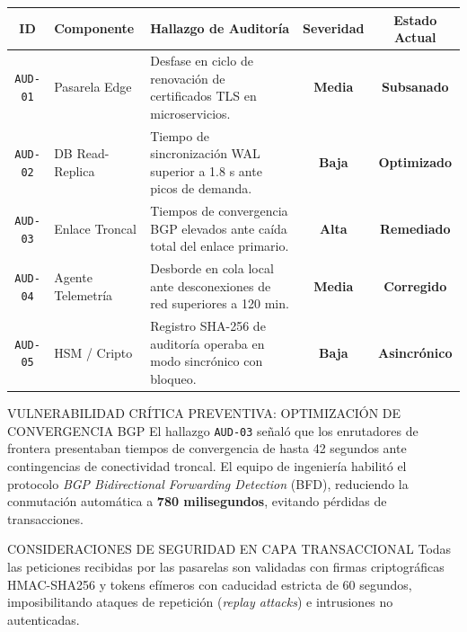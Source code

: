 \documentclass[11pt,letterpaper]{article}
\begin{document}
\noindent
\begin{tabularx}{\linewidth}{@{}c p{2.8cm} X c c@{}}
  \toprule
  \textbf{\color{corpPrimary}ID} & \textbf{\color{corpPrimary}Componente} & \textbf{\color{corpPrimary}Hallazgo de Auditor\'ia} & \textbf{\color{corpPrimary}Severidad} & \textbf{\color{corpPrimary}Estado Actual} \\
  \midrule
  \texttt{AUD-01} & Pasarela Edge & Desfase en ciclo de renovaci\'on de certificados TLS en microservicios. & \textbf{\color{corpWarning}Media} & \textbf{\color{corpSuccess}Subsanado} \\
  \addlinespace[3pt]
  \texttt{AUD-02} & DB Read-Replica & Tiempo de sincronizaci\'on WAL superior a 1.8 s ante picos de demanda. & \textbf{\color{corpWarning}Baja} & \textbf{\color{corpSuccess}Optimizado} \\
  \addlinespace[3pt]
  \texttt{AUD-03} & Enlace Troncal & Tiempos de convergencia BGP elevados ante ca\'ida total del enlace primario. & \textbf{\color{corpDanger}Alta} & \textbf{\color{corpSuccess}Remediado} \\
  \addlinespace[3pt]
  \texttt{AUD-04} & Agente Telemetr\'ia & Desborde en cola local ante desconexiones de red superiores a 120 min. & \textbf{\color{corpWarning}Media} & \textbf{\color{corpSuccess}Corregido} \\
  \addlinespace[3pt]
  \texttt{AUD-05} & HSM / Cripto & Registro SHA-256 de auditor\'ia operaba en modo sincr\'onico con bloqueo. & \textbf{\color{corpWarning}Baja} & \textbf{\color{corpSuccess}Asincr\'onico} \\
  \bottomrule
\end{tabularx}

\vspace{0.8em}

\begin{corpalert}{VULNERABILIDAD CR\'ITICA PREVENTIVA: OPTIMIZACI\'ON DE CONVERGENCIA BGP}
  El hallazgo \texttt{AUD-03} se\~nal\'o que los enrutadores de frontera presentaban tiempos de convergencia de hasta 42 segundos ante contingencias de conectividad troncal. El equipo de ingenier\'ia habilit\'o el protocolo \textit{BGP Bidirectional Forwarding Detection} (BFD), reduciendo la conmutaci\'on autom\'atica a \textbf{780 milisegundos}, evitando p\'erdidas de transacciones.
\end{corpalert}

\begin{corpnote}{CONSIDERACIONES DE SEGURIDAD EN CAPA TRANSACCIONAL}
  Todas las peticiones recibidas por las pasarelas son validadas con firmas criptogr\'aficas HMAC-SHA256 y tokens ef\'imeros con caducidad estricta de 60 segundos, imposibilitando ataques de repetici\'on (\textit{replay attacks}) e intrusiones no autenticadas.
\end{corpnote}
\end{document}

